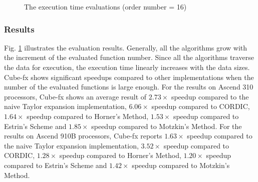\begin{figure}[thp]
    \caption{The execution time evaluations (order number = 16)}
    \label{fig:compare}
    \end{figure}

\subsubsection{Results}

Fig. \ref{fig:compare} illustrates the evaluation results. Generally, all the algorithms grow with the increment of the evaluated function number. Since all the algorithms traverse the data for execution, the execution time linearly increases with the data sizes. Cube-fx shows significant speedups compared to other implementations when the number of the evaluated functions is large enough. For the results on Ascend 310 processors, Cube-fx shows an average result of $2.73\times$ speedup compared to the naive Taylor expansion implementation, $6.06\times$ speedup compared to CORDIC, $1.64\times$ speedup compared to Horner's Method, $1.53\times$ speedup compared to Estrin's Scheme and $1.85\times$ speedup compared to Motzkin's Method. For the results on Ascend 910B processors, Cube-fx reports $1.63\times$ speedup compared to the naive Taylor expansion implementation, $3.52\times$ speedup compared to CORDIC, $1.28\times$ speedup compared to Horner's Method, $1.20\times$ speedup compared to Estrin's Scheme and $1.42\times$ speedup compared to Motzkin's Method. 

